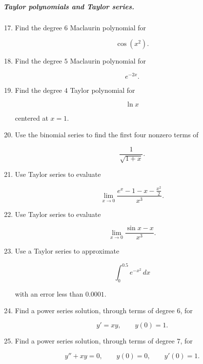 \subparagraph{Taylor polynomials and Taylor series.}
\begin{enumerate}
\setcounter{enumi}{16}

\item Find the degree \(6\) Maclaurin polynomial for

\[
\cos(x^2).
\]

\item Find the degree \(5\) Maclaurin polynomial for

\[
e^{-2x}.
\]

\item Find the degree \(4\) Taylor polynomial for

\[
\ln x
\]

centered at \(x=1\).

\item Use the binomial series to find the first four nonzero terms of

\[
\frac1{\sqrt{1+x}}.
\]

\item Use Taylor series to evaluate

\[
\lim_{x\to0}\frac{e^x-1-x-\frac{x^2}{2}}{x^3}.
\]

\item Use Taylor series to evaluate

\[
\lim_{x\to0}\frac{\sin x-x}{x^3}.
\]

\item Use a Taylor series to approximate

\[
\int_0^{0.5} e^{-x^2}\,dx
\]

with an error less than \(0.0001\).

\item Find a power series solution, through terms of degree \(6\), for

\[
y'=xy,
\qquad
y(0)=1.
\]

\item Find a power series solution, through terms of degree \(7\), for

\[
y''+xy=0,
\qquad
y(0)=0,
\qquad
y'(0)=1.
\]
\end{enumerate}

